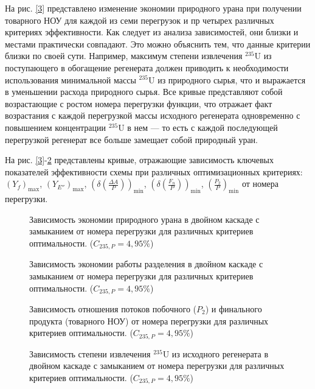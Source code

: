 На рис. \ref{3} представлено изменение экономии природного урана при получении товарного НОУ для каждой из семи перегрузок и пр четырех различных критериях эффективности. Как следует из анализа зависимостей, они близки и местами практически совпадают. Это можно объяснить тем, что данные критерии близки по своей сути. Например, максимум степени извлечения $^{235}$U из поступающего в обогащение регенерата должен приводить к необходимости использования минимальной массы $^{235}$U из природного сырья, что и выражается в уменьшении расхода природного сырья. Все кривые представляют собой возрастающие с ростом номера перегрузки функции, что отражает факт возрастания с каждой перегрузкой массы исходного регенерата одновременно с повышением концентрации $^{235}$U в нем --- то есть с каждой последующей перегрузкой регенерат все больше замещает собой природный уран.

На рис. \ref{3}-\ref{4} представлены кривые, отражающие зависимость ключевых показателей эффективности схемы при различных оптимизационных критериях: $(Y_f)_\text{max}$, $(Y_{E''})_\text{max}$, $(\delta(\frac{\Delta A}{P}))_\text{min}$, $(\delta(\frac{F_n}{P}))_\text{min}$, $(\frac{P_2}{P})_\text{min}$ от номера перегрузки.

\begin{figure}[ht]
    \centering
    \begin{minipage}{.5\textwidth}
      \centering
      
      \caption{{Зависимость экономии природного урана в двойном каскаде с замыканием от номера перегрузки для различных критериев оптимальности. ($C_{235,{P}}=4,95\%$){\label{3}}}}
    \end{minipage}%
    \begin{minipage}{.5\textwidth}
        \centering
        
  \caption{{Зависимость экономии работы разделения в двойном каскаде с замыканием от номера перегрузки для различных критериев оптимальности. ($C_{235,{P}}=4,95\%$){\label{6}}}}
  \end{minipage}
\end{figure}

\begin{figure}[ht]
    \centering
    \begin{minipage}{.51\textwidth}
      \centering
      
      \caption{{Зависимость отношения потоков побочного ($P_2$) и финального продукта (товарного НОУ) от  номера перегрузки для различных критериев оптимальности. ($C_{235,{P}}=4,95\%$){\label{5}}}}
    \end{minipage}%
    \begin{minipage}{.5\textwidth}
        \centering
        
    \caption{{Зависимость степени извлечения $^{235}$U из исходного регенерата в двойном каскаде с замыканием от номера перегрузки для различных критериев оптимальности. ($C_{235,{P}}=4,95\%$){\label{4}}}}
    \end{minipage}
\end{figure}

